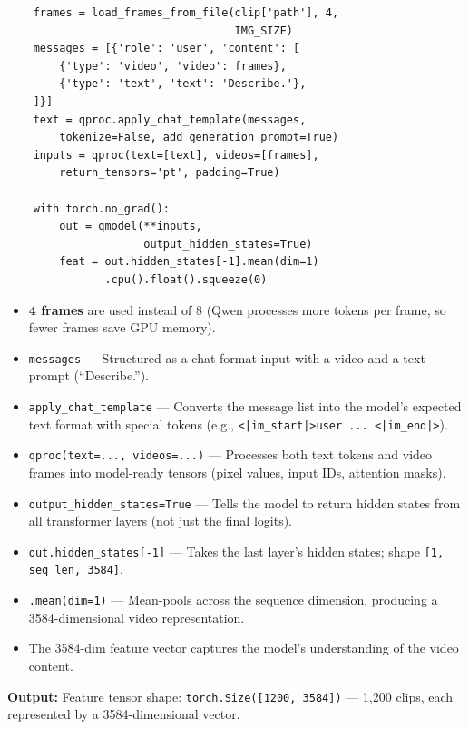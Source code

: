 \begin{lstlisting}
    frames = load_frames_from_file(clip['path'], 4,
                                   IMG_SIZE)
    messages = [{'role': 'user', 'content': [
        {'type': 'video', 'video': frames},
        {'type': 'text', 'text': 'Describe.'},
    ]}]
    text = qproc.apply_chat_template(messages,
        tokenize=False, add_generation_prompt=True)
    inputs = qproc(text=[text], videos=[frames],
        return_tensors='pt', padding=True)

    with torch.no_grad():
        out = qmodel(**inputs,
                     output_hidden_states=True)
        feat = out.hidden_states[-1].mean(dim=1)
               .cpu().float().squeeze(0)
\end{lstlisting}

\begin{explanation}
\begin{itemize}[nosep]
  \item \textbf{4 frames} are used instead of 8 (Qwen processes more tokens per frame, so fewer frames save GPU memory).
  \item \texttt{messages} --- Structured as a chat-format input with a video and a text prompt (``Describe.'').
  \item \texttt{apply\_chat\_template} --- Converts the message list into the model's expected text format with special tokens (e.g., \texttt{<|im\_start|>user ... <|im\_end|>}).
  \item \texttt{qproc(text=..., videos=...)} --- Processes both text tokens and video frames into model-ready tensors (pixel values, input IDs, attention masks).
  \item \texttt{output\_hidden\_states=True} --- Tells the model to return hidden states from all transformer layers (not just the final logits).
  \item \texttt{out.hidden\_states[-1]} --- Takes the last layer's hidden states; shape \texttt{[1, seq\_len, 3584]}.
  \item \texttt{.mean(dim=1)} --- Mean-pools across the sequence dimension, producing a 3584-dimensional video representation.
  \item The 3584-dim feature vector captures the model's understanding of the video content.
\end{itemize}
\end{explanation}

\textbf{Output:} Feature tensor shape: \texttt{torch.Size([1200, 3584])} --- 1,200 clips, each represented by a 3584-dimensional vector.

